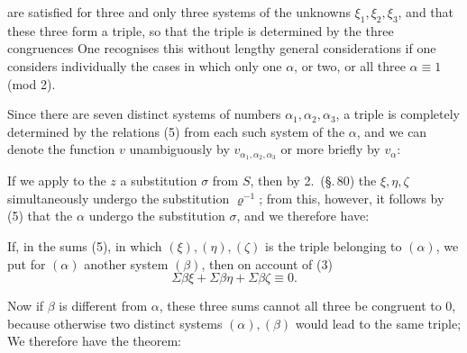 
are satisfied for three and only three systems of the unknowns $\xi_1, \xi_2, \xi_3$, and that these three form a triple, so that the triple is determined by the three congruences
One recognises this without lengthy general considerations if one considers individually the cases in which only one $\alpha$, or two, or all three $\alpha \equiv 1$ (mod 2).

Since there are seven distinct systems of numbers $\alpha_1, \alpha_2, \alpha_3$, a triple is completely determined by the relations (5) from each such system of the $\alpha$, and we can denote the function $v$ unambiguously by $v_{\alpha_1,\alpha_2,\alpha_3}$ or more briefly by $v_\alpha$:


If we apply to the $z$ a substitution $\sigma$ from $S$, then by 2.\ (\S.\,80) the $\xi, \eta, \zeta$ simultaneously undergo the substitution $\varrho^{-1}$; from this, however, it follows by (5) that the $\alpha$ undergo the substitution $\sigma$, and we therefore have:


If, in the sums (5), in which $(\xi), (\eta), (\zeta)$ is the triple belonging to $(\alpha)$, we put for $(\alpha)$ another system $(\beta)$, then on account of (3)
\[
\Sigma \beta\xi + \Sigma \beta\eta + \Sigma \beta\zeta \equiv 0.
\]

Now if $\beta$ is different from $\alpha$, these three sums cannot all three be congruent to 0, because otherwise two distinct systems $(\alpha), (\beta)$ would lead to the same triple;  We therefore have the theorem:

